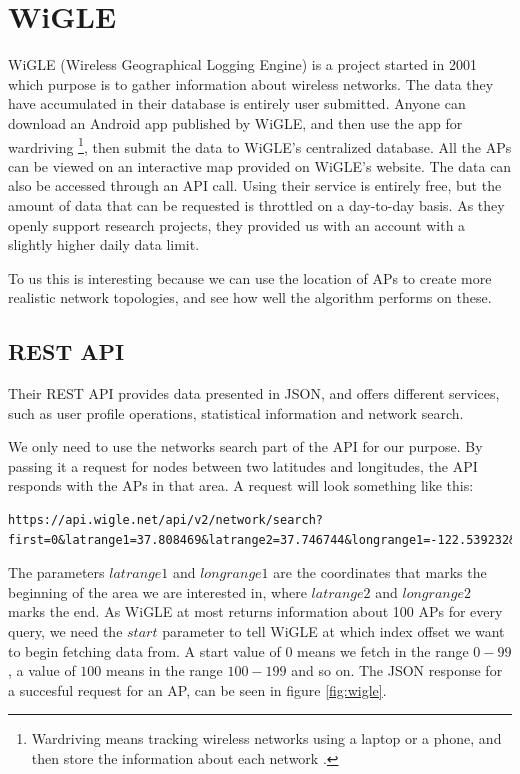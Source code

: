   \section{WiGLE}
  WiGLE (Wireless Geographical Logging Engine) \cite{wigle} is a project started in 2001
  which purpose is to gather information about wireless networks. The data they have
  accumulated in their database is entirely user submitted. Anyone can download an 
  Android app  published by WiGLE, and then use the app for wardriving
  \footnote{Wardriving means tracking wireless networks using a laptop or a phone,
	  and then store the information about each network \cite{Wardriving}.},
	  then submit the data to WiGLE's centralized database. All the APs can be viewed on an interactive
	  map provided on WiGLE's website. The data can also be accessed through an API call.
	  Using their service is entirely free, but the amount of data
	  that can be requested is throttled on a day-to-day basis. As they openly support
	  research projects, they provided us with an account with a slightly higher daily data
	  limit.

	  To us this is interesting because we can use the location of APs to
	  create more realistic network topologies, and see how well the algorithm 
	  performs on these. 


	  \subsection{REST API}
	  Their REST API provides data presented in JSON, and offers different services,
	  such as user profile operations, statistical information and network search.

	  We only need to use the networks search part of the API for our purpose. 
	  By passing it a request for nodes between two latitudes
	  and longitudes, the API responds with the APs in that area.  
	  A request will look something like this: 
	  \begin{lstlisting}[breaklines]
	  https://api.wigle.net/api/v2/network/search?first=0&latrange1=37.808469&latrange2=37.746744&longrange1=-122.539232&longrange2=-122.381355
	  \end{lstlisting}
	  The parameters $latrange1$ and $longrange1$ are the coordinates that marks the beginning 
	  of the area we are interested in, where $latrange2$ and $longrange2$ marks the end. 
	  As WiGLE at most returns information about 100 APs for every query, we need the $start$
	  parameter to tell WiGLE at which index offset we want to begin fetching data from.
	  A start value of $0$ means we fetch in the range $0-99$, a value of $100$ means in the
	  range $100-199$ and so on. The JSON response for a succesful request for an AP,
	  can be seen in figure \ref{fig:wigle}.

